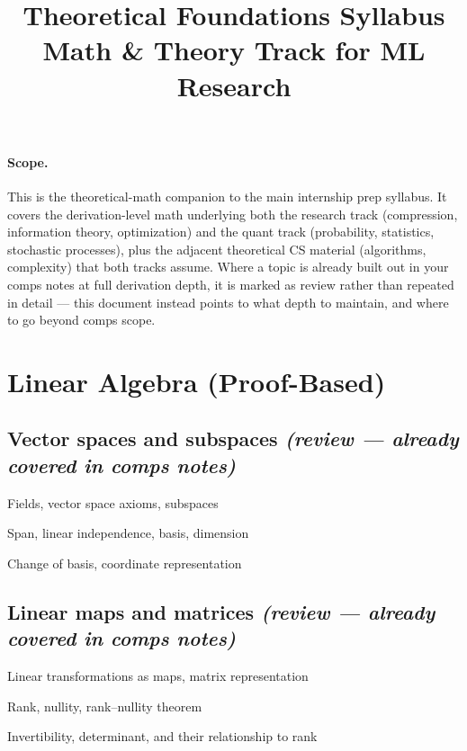 \documentclass[11pt]{article}
\title{\textbf{Theoretical Foundations Syllabus} \\[4pt]
\large Math \& Theory Track for ML Research }
\author{}
\date{}
\newcommand{\review}{\textit{(review — already covered in comps notes)}}
\begin{document}
\maketitle
\vspace{-2em}

\paragraph{Scope.} This is the theoretical-math companion to the main internship prep syllabus. It covers the derivation-level math underlying both the research track (compression, information theory, optimization) and the quant track (probability, statistics, stochastic processes), plus the adjacent theoretical CS material (algorithms, complexity) that both tracks assume. Where a topic is already built out in your comps notes at full derivation depth, it is marked as review rather than repeated in detail — this document instead points to what depth to maintain, and where to go beyond comps scope.

\tableofcontents
\vspace{1em}

\section{Linear Algebra (Proof-Based)}

\subsection{Vector spaces and subspaces \review}
\begin{tasklist}
    \item Fields, vector space axioms, subspaces
    \item Span, linear independence, basis, dimension
    \item Change of basis, coordinate representation
\end{tasklist}

\subsection{Linear maps and matrices \review}
\begin{tasklist}
    \item Linear transformations as maps, matrix representation
    \item Rank, nullity, rank--nullity theorem
    \item Invertibility, determinant, and their relationship to rank
\end{tasklist}
\end{document}
